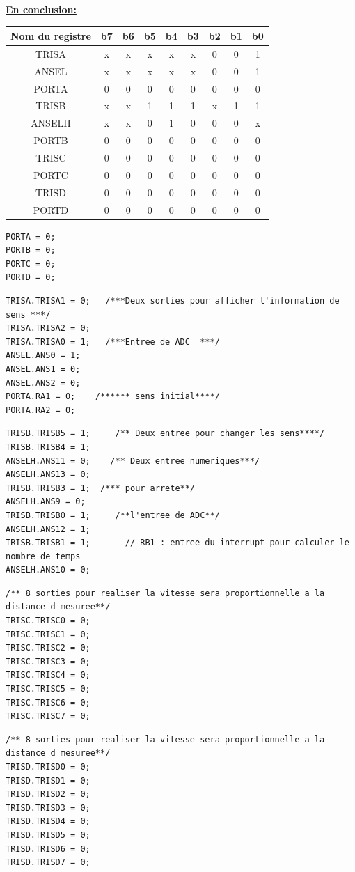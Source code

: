 \documentclass{article}
\begin{document}
\pagebreak
\textbf{\underline{En conclusion:}}
\begin{table}[htbp]
	\centering
	\begin{tabular}[h]{|c|c|c|c|c|c|c|c|c|}
		\hline
	    Nom du registre&b7&b6&b5&b4&b3&b2&b1&b0\\
	    \hline
	    TRISA&x&x&x&x&x&0&0&1\\
	    \hline
	    ANSEL&x&x&x&x&x&0&0&1\\
	    \hline
	    PORTA&0&0&0&0&0&0&0&0\\
	    \hline
	    TRISB&x&x&1&1&1&x&1&1\\
	     \hline
	    ANSELH&x&x&0&1&0&0&0&x\\
	     \hline
	    PORTB&0&0&0&0&0&0&0&0\\
	     \hline
	    TRISC&0&0&0&0&0&0&0&0\\
	     \hline
	    PORTC&0&0&0&0&0&0&0&0\\
	     \hline
	    TRISD&0&0&0&0&0&0&0&0\\
	     \hline
	    PORTD&0&0&0&0&0&0&0&0\\
	     \hline
	\end{tabular}
\end{table}

\begin{lstlisting}[frame=shadowbox]
PORTA = 0;
PORTB = 0;
PORTC = 0;
PORTD = 0;
\end{lstlisting}
\begin{lstlisting}[frame=shadowbox]
TRISA.TRISA1 = 0;   /***Deux sorties pour afficher l'information de sens ***/
TRISA.TRISA2 = 0;
TRISA.TRISA0 = 1;   /***Entree de ADC  ***/
ANSEL.ANS0 = 1;
ANSEL.ANS1 = 0;
ANSEL.ANS2 = 0;
PORTA.RA1 = 0;    /****** sens initial****/
PORTA.RA2 = 0;
\end{lstlisting}
\begin{lstlisting}[frame=shadowbox]
TRISB.TRISB5 = 1;     /** Deux entree pour changer les sens****/
TRISB.TRISB4 = 1;
ANSELH.ANS11 = 0;    /** Deux entree numeriques***/
ANSELH.ANS13 = 0;
TRISB.TRISB3 = 1;  /*** pour arrete**/
ANSELH.ANS9 = 0;
TRISB.TRISB0 = 1;     /**l'entree de ADC**/
ANSELH.ANS12 = 1;
TRISB.TRISB1 = 1;       // RB1 : entree du interrupt pour calculer le nombre de temps
ANSELH.ANS10 = 0;
\end{lstlisting}
\begin{lstlisting}[frame=shadowbox]
/** 8 sorties pour realiser la vitesse sera proportionnelle a la distance d mesuree**/
TRISC.TRISC0 = 0;
TRISC.TRISC1 = 0;
TRISC.TRISC2 = 0;
TRISC.TRISC3 = 0;
TRISC.TRISC4 = 0;
TRISC.TRISC5 = 0;
TRISC.TRISC6 = 0;
TRISC.TRISC7 = 0;
\end{lstlisting}
\begin{lstlisting}[frame=shadowbox]
/** 8 sorties pour realiser la vitesse sera proportionnelle a la distance d mesuree**/
TRISD.TRISD0 = 0;
TRISD.TRISD1 = 0;
TRISD.TRISD2 = 0;
TRISD.TRISD3 = 0;
TRISD.TRISD4 = 0;
TRISD.TRISD5 = 0;
TRISD.TRISD6 = 0;
TRISD.TRISD7 = 0;
\end{lstlisting}
\end{document}
